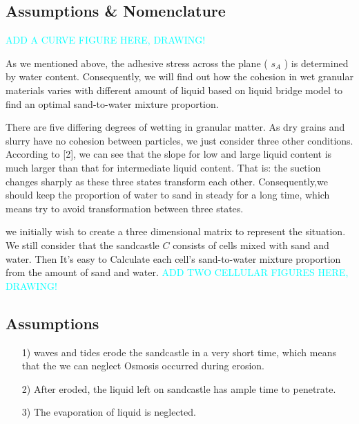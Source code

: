 \documentclass[12pt]{article}
\begin{document}
\subsection{Assumptions \& Nomenclature}
\textcolor{cyan}{ADD A CURVE FIGURE HERE, DRAWING!}
\par
As we mentioned above, the adhesive stress across the plane ( $s_A$ ) is determined by water content. Consequently, we will find out how the cohesion in wet granular materials varies with different amount of liquid based on liquid bridge model to find an optimal sand-to-water mixture proportion.
\par
There are five differing degrees of wetting in granular matter. As dry grains and slurry have no cohesion between particles, we just consider three other conditions. According to [2], we can see that the slope for low and large liquid content is much larger than that for intermediate liquid content. That is: the suction changes sharply as these three states transform each other. Consequently,we should keep the proportion of water to sand in steady for a long time, which means try to avoid transformation between three states. 
\par
we initially wish to create a three dimensional matrix to represent the situation. We still consider that the sandcastle $C$ consists of cells mixed with sand and water. Then It's easy to Calculate each cell’s sand-to-water mixture proportion from the amount of sand and water. 
\textcolor{cyan}{ADD TWO CELLULAR FIGURES HERE, DRAWING!}
\subsection{Assumptions}
\begin{itemize}
	\item [1)] 
	waves and tides erode the sandcastle in a very short time, which means that the we can neglect Osmosis occurred during erosion.
	\item [2)]
	After eroded, the liquid left on sandcastle has ample time to penetrate.
	\item [3)]
	The evaporation of liquid is neglected.
\end{itemize}
\end{document}
